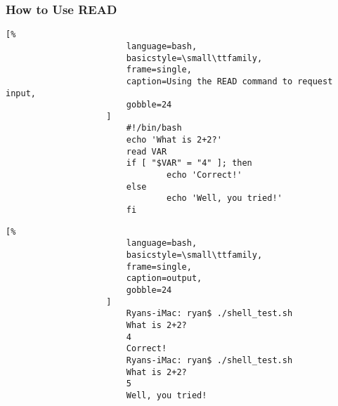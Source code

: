 \documentclass[crop=false,class=book,oneside]{standalone}
\begin{document}
            \subsubsection{How to Use READ}
                \begin{minipage}[t]{.48\textwidth}
                    \centering
                    \begin{lstlisting}[%
                        language=bash,
                        basicstyle=\small\ttfamily,
                        frame=single,
                        caption=Using the READ command to request input,
                        gobble=24
                    ]
                        #!/bin/bash
                        echo 'What is 2+2?'
                        read VAR
                        if [ "$VAR" = "4" ]; then
                                echo 'Correct!'
                        else
                                echo 'Well, you tried!'
                        fi
                    \end{lstlisting}
                \end{minipage}
                \hfill
                \begin{minipage}[t]{.48\textwidth}
                    \centering
                    \begin{lstlisting}[%
                        language=bash,
                        basicstyle=\small\ttfamily,
                        frame=single,
                        caption=output,
                        gobble=24
                    ]
                        Ryans-iMac: ryan$ ./shell_test.sh 
                        What is 2+2?
                        4
                        Correct!
                        Ryans-iMac: ryan$ ./shell_test.sh 
                        What is 2+2?
                        5
                        Well, you tried!
                    \end{lstlisting}
                \end{minipage}
            \newpage
\end{document}
